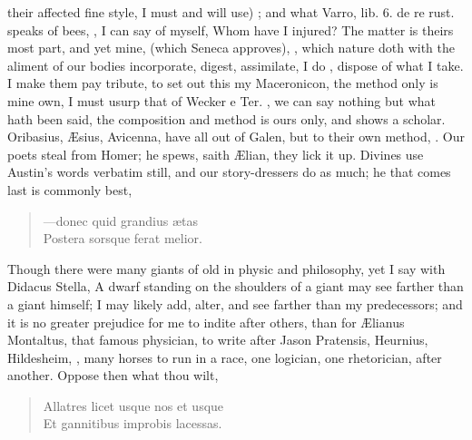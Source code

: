 {their affected fine style, I must and will use) ;
and what Varro, lib. 6. de re rust. speaks of bees, , I can say of myself, Whom
have I injured? The matter is theirs most part, and yet mine,  (which Seneca approves), , which nature doth with the aliment of our bodies
incorporate, digest, assimilate, I do , dispose of
what I take. I make them pay tribute, to set out this my Maceronicon,
the method only is mine own, I must usurp that of Wecker e Ter.
,
we can say nothing but what hath been said, the composition and method
is ours only, and shows a scholar. Oribasius, \AE{}sius, Avicenna, have
all out of Galen, but to their own method, . Our poets steal from Homer; he spews, saith \AE{}lian, they lick it
up. Divines use Austin's words verbatim still, and our story-dressers
do as much; he that comes last is commonly best,

\begin{verse}
---\textlatin{donec quid grandius \ae{}tas}\\
\textlatin{Postera sorsque ferat melior}.
\end{verse}

Though there were many giants of old in physic and philosophy, yet I
say with Didacus Stella, A dwarf standing on the shoulders of a
giant may see farther than a giant himself; I may likely add, alter,
and see farther than my predecessors; and it is no greater prejudice
for me to indite after others, than for \AE{}lianus Montaltus, that famous
physician, to write  after Jason Pratensis, Heurnius,
Hildesheim, \etc, many horses to run in a race, one logician, one
rhetorician, after another. Oppose then what thou wilt,

\begin{verse}
\textlatin{Allatres licet usque nos et usque}\\
\textlatin{Et gannitibus improbis lacessas.}\\
\end{verse}

}
